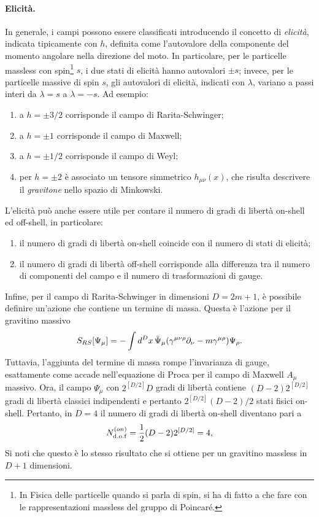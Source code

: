 \paragraph{Elicità.} In generale, i campi possono essere classificati introducendo il concetto di \emph{elicità}, indicata tipicamente con $h$, definita come l'autovalore della componente del momento angolare nella direzione del moto. In particolare, per le particelle massless con spin\footnote{In Fisica delle particelle quando si parla di spin, si ha di fatto a che fare con le rappresentazioni massless del gruppo di Poincaré.} $s$, i due stati di elicità hanno autovalori $\pm s$; invece, per le particelle massive di spin $s$, gli autovalori di elicità, indicati con $\lambda$, variano a passi interi da $\lambda = s$ a $\lambda= -s$. Ad esempio:
\begin{enumerate}
    \item a $h = \pm 3/2$ corrisponde il campo di Rarita-Schwinger;
    \item a $h = \pm1$ corrisponde il campo di Maxwell;
    \item a $h = \pm 1/2$ corrisponde il campo di Weyl;
    \item per $h = \pm 2$ è associato un tensore simmetrico $h_{\mu\nu}(x)$, che risulta descrivere il \emph{gravitone} nello spazio di Minkowski.
\end{enumerate}
L'elicità può anche essere utile per contare il numero di gradi di libertà on-shell ed off-shell, in particolare: 
\begin{enumerate}
    \item il numero di gradi di libertà on-shell coincide con il numero di stati di elicità;
    \item il numero di gradi di libertà off-shell corrisponde alla differenza tra il numero di componenti del campo e il numero di trasformazioni di gauge. 
\end{enumerate}

Infine, per il campo di Rarita-Schwinger in dimensioni $D = 2m + 1$, è possibile definire un'azione che contiene un termine di massa. Questa è l'azione per il gravitino massivo
\begin{equation}
\label{eq: azione di Rarita-Schwinger (massivo)}
    S_{RS}[\Psi_\mu] = -\int d^Dx\,\bar{\Psi}_\mu(\gamma^{\mu\nu\rho}\partial_\nu - m\gamma^{\mu\rho})\Psi_\rho.
\end{equation}
Tuttavia, l'aggiunta del termine di massa rompe l'invarianza di gauge, esattamente come accade nell'equazione di Proca per il campo di Maxwell $A_\mu$ massivo. Ora, il campo $\Psi_\mu$ con $2^{[D/2]}D$ gradi di libertà contiene $(D - 2)2^{[D/2]}$ gradi di libertà classici indipendenti e pertanto $2^{[D/2]}(D - 2)/2$ stati fisici on-shell. Pertanto, in $D = 4$ il numero di gradi di libertà on-shell diventano pari a 
\begin{equation}
    N_{\mathrm{d.o.f}}^{(on)} = \frac{1}{2}(D - 2)2^{[D/2]} = 4,
\end{equation}
Si noti che questo è lo stesso risultato che si ottiene per un gravitino massless in $D + 1$ dimensioni. 